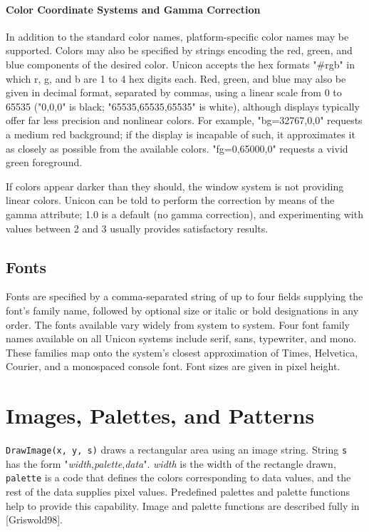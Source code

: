 \paragraph{Color Coordinate Systems and Gamma Correction}
In addition to the standard color names, platform-specific color names
may be supported. Colors may also be specified by strings encoding the
red, green, and blue components of the desired color. Unicon accepts
the hex formats "\#rgb" in which r, g, and b are 1 to 4 hex digits
each. Red, green, and blue may also be given in decimal format,
separated by commas, using a linear scale from 0
to 65535 ("0,0,0" is black; "65535,65535,65535" is white), although
displays typically offer far less precision and
nonlinear colors. For example, "bg=32767,0,0" requests a medium red
background; if the display is incapable of such, it approximates it as
closely as possible from the available colors.  "fg=0,65000,0"
requests a vivid green foreground.

If colors appear darker than they
should, the window system is not providing linear colors. Unicon can
be told to perform the correction by means of the gamma attribute; 1.0
is a default (no gamma correction), and experimenting with values
between 2 and 3 usually provides satisfactory results.

\subsection*{Fonts}

Fonts are specified by a comma-separated string of up to four fields
supplying the font's family name, followed by optional size or italic
or bold designations in any order. The fonts available vary widely
from system to system. Four font family names available on all Unicon
systems include serif, sans, typewriter, and mono. These families map
onto the system's closest approximation of Times, Helvetica, Courier,
and a monospaced console font. Font sizes are given in pixel height.

\section{Images, Palettes, and Patterns}

\texttt{DrawImage(x, y, s)} draws a rectangular area using an image
string.  String \texttt{s} has the form
"\textit{width},\textit{palette},\textit{data}".  \textit{width} is
the width of the rectangle drawn, \texttt{palette} is a code that
defines the colors corresponding to data values, and the rest of the
data supplies pixel values. Predefined palettes and palette functions
help to provide this capability. Image and palette functions are
described fully in [Griswold98].

